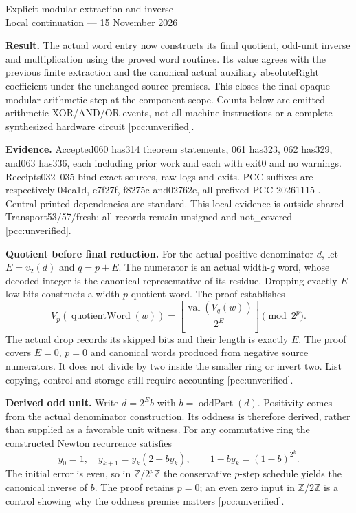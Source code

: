 \documentclass[10pt]{article}
\begin{document}
\begin{center}{\Large Explicit modular extraction and inverse}\\[4pt]
Local continuation --- 15 November 2026\end{center}
\textbf{Result.} The actual word entry now constructs its final quotient,
odd-unit inverse and multiplication using the proved word routines. Its value
agrees with the previous finite extraction and the canonical actual auxiliary
absoluteRight coefficient under the unchanged source premises. This closes
the final opaque modular arithmetic step at the component scope. Counts below
are emitted arithmetic XOR/AND/OR events, not all machine instructions or a
complete synthesized hardware circuit [pcc:unverified].

\textbf{Evidence.} Accepted060 has314 theorem statements, 061 has323, 062
has329, and063 has336, each including prior work and each with exit0 and no
warnings. Receipts032--035 bind exact sources, raw logs and exits. PCC suffixes
are respectively 04ea1d, e7f27f, f8275c and02762e, all prefixed
PCC-20261115-. Central printed dependencies are standard. This local evidence
is outside shared Transport53/57/fresh; all records remain unsigned and
not\_covered [pcc:unverified].

\textbf{Quotient before final reduction.} For the actual positive denominator
$d$, let $E=v_2(d)$ and $q=p+E$. The numerator is an actual width-$q$ word,
whose decoded integer is the canonical representative of its residue. Dropping
exactly $E$ low bits constructs a width-$p$ quotient word. The proof establishes
\[
 V_p(\operatorname{quotientWord}(w))
 =\left\lfloor\frac{\operatorname{val}(V_q(w))}{2^E}\right\rfloor
 \pmod {2^p}.
\]
The actual drop records its skipped bits and their length is exactly $E$.
The proof covers $E=0$, $p=0$ and canonical words produced from negative
source numerators. It does not divide by two inside the smaller ring or invert
two. List copying, control and storage still require accounting
[pcc:unverified].

\textbf{Derived odd unit.} Write $d=2^E b$ with $b=\operatorname{oddPart}(d)$.
Positivity comes from the actual denominator construction. Its oddness is
therefore derived, rather than supplied as a favorable unit witness.
For any commutative ring the constructed Newton recurrence satisfies
\[
 y_0=1,\quad y_{k+1}=y_k(2-by_k),\qquad
 1-by_k=(1-b)^{2^k}.
\]
The initial error is even, so in $\mathbb Z/2^p\mathbb Z$ the conservative
$p$-step schedule yields the canonical inverse of $b$. The proof retains
$p=0$; an even zero input in $\mathbb Z/2\mathbb Z$ is a control showing why
the oddness premise matters [pcc:unverified].
\end{document}
